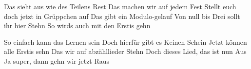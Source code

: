 \begin{verseplay}[10em]

\s{\Sing}Das sieht aus wie des Teilens Rest
\s{\Chor} Das machen wir auf jedem Fest
\s{\Sing}Stellt euch doch jetzt in Grüppchen auf
\s{\Chor} Das gibt ein Modulo-gelauf
\s{\Sing}Von null bis Drei sollt ihr hier Stehn
\s{\Chor} So wirds auch mit den Erstis gehn

\end{verseplay}
\begin{verseplay}[10em]

\s{\Sing}So einfach kann das Lernen sein
\s{\Chor} Doch hierfür gibt es Keinen Schein
\s{\Sing} Jetzt können alle Erstis sehn
\s{\Chor} Das wir auf abzähllieder Stehn
\s{\Sing} Doch dieses Lied, das ist nun Aus
\s{\Chor} Ja super, dann gehn wir jetzt Raus
\end{verseplay}

